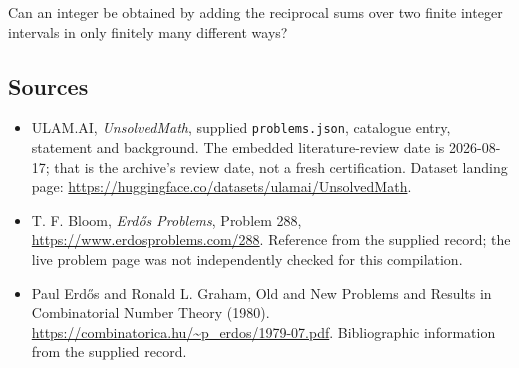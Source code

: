 \documentclass[11pt,a4paper]{article}
\begin{document}
Can an integer be obtained by adding the reciprocal sums over two finite integer intervals in only finitely many different ways?

\subsection{Sources}

{\small

\begin{itemize}

\item[\hypertarget{source:statement:1}{S1}] ULAM.AI, \emph{UnsolvedMath}, supplied \texttt{problems.json}, catalogue entry, statement and background. The embedded literature-review date is 2026-08-17; that is the archive’s review date, not a fresh certification. Dataset landing page: \url{https://huggingface.co/datasets/ulamai/UnsolvedMath}.

\item[\hypertarget{source:statement:2}{S2}] T. F. Bloom, \emph{Erdős Problems}, Problem 288, \url{https://www.erdosproblems.com/288}. Reference from the supplied record; the live problem page was not independently checked for this compilation.

\item[\hypertarget{source:statement:3}{S3}] Paul Erdős and Ronald L. Graham, Old and New Problems and Results in Combinatorial Number Theory (1980). \url{https://combinatorica.hu/~p_erdos/1979-07.pdf}. Bibliographic information from the supplied record.

\end{itemize}

}

\label{end:statement}
\end{document}
